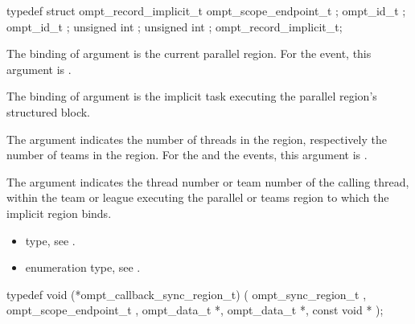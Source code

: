 \record

\begin{ccppspecific}
\begin{omptRecord}
typedef struct ompt_record_implicit_t {
  ompt_scope_endpoint_t ;
  ompt_id_t ;
  ompt_id_t ;
  unsigned int ;
  unsigned int ;
} ompt_record_implicit_t;
\end{omptRecord}
\end{ccppspecific}


\argdesc

\epdesc

The binding of argument  is the current
parallel region.
For the  event, this argument is .

The binding of argument  is the implicit task
executing the parallel region's structured block.

The argument  indicates the number of
threads in the  region, respectively the number of 
teams in the  region.
For the  and the  events, 
this argument is .

The argument  indicates the thread number or team number 
of the calling thread, within the team or league executing the 
parallel or teams region to which the implicit region binds.

\crossreferences
\begin{itemize}
\item {} type, see
.
\item {} enumeration type, see
.
\end{itemize}



\label{sec:ompt_callback_sync_region_t}
\format

\begin{ccppspecific}
\begin{omptCallback}
typedef void (*ompt_callback_sync_region_t) (
  ompt_sync_region_t ,
  ompt_scope_endpoint_t ,
  ompt_data_t *,
  ompt_data_t *,
  const void *
);
\end{omptCallback}
\end{ccppspecific}


